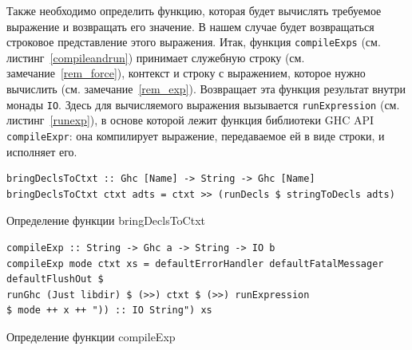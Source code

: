 		Также необходимо определить функцию, которая будет вычислять требуемое выражение и возвращать его значение. В нашем случае будет возвращаться строковое представление этого выражения. Итак, функция \lstinline!compileExps! (см. листинг~\ref{compileandrun}) принимает служебную строку (см. замечание~\ref{rem_force}), контекст и строку с выражением, которое нужно вычислить (см. замечание~\ref{rem_exp}). Возвращает эта функция результат внутри монады \lstinline!IO!. Здесь для вычисляемого выражения вызывается \lstinline!runExpression! (см. листинг~\ref{runexp}), в основе которой лежит функция библиотеки GHC API \lstinline!compileExpr!: она компилирует выражение, передаваемое ей в виде строки, и исполняет его.

\label{rem_force}

\label{rem_exp}

\begin{ListingEnv}[h]
	\begin{lstlisting}
bringDeclsToCtxt :: Ghc [Name] -> String -> Ghc [Name]
bringDeclsToCtxt ctxt adts = ctxt >> (runDecls $ stringToDecls adts)
	\end{lstlisting}
	\caption{Определение функции bringDeclsToCtxt}\label{bringDecls}
\end{ListingEnv}		

\begin{ListingEnv}[h]
	\begin{lstlisting}
compileExp :: String -> Ghc a -> String -> IO b
compileExp mode ctxt xs = defaultErrorHandler defaultFatalMessager defaultFlushOut $
runGhc (Just libdir) $ (>>) ctxt $ (>>) runExpression
$ mode ++ x ++ ")) :: IO String") xs
	\end{lstlisting}
	\caption{Определение функции compileExp}\label{compileandrun}
\end{ListingEnv}

